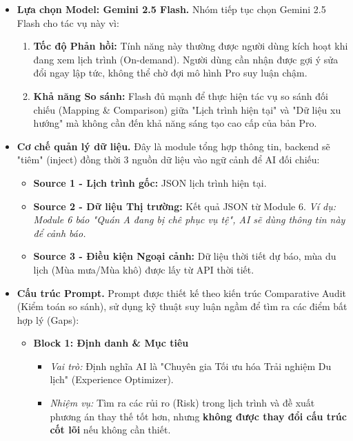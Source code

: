 \begin{itemize}
    \item \textbf{Lựa chọn Model: Gemini 2.5 Flash.} Nhóm tiếp tục chọn Gemini 2.5 Flash cho tác vụ này vì:
    \begin{enumerate}[label=\arabic*., leftmargin=*]
        \item \textbf{Tốc độ Phản hồi:} Tính năng này thường được người dùng kích hoạt khi đang xem lịch trình (On-demand). Người dùng cần nhận được gợi ý sửa đổi ngay lập tức, không thể chờ đợi mô hình Pro suy luận chậm.
        
        \item \textbf{Khả năng So sánh:} Flash đủ mạnh để thực hiện tác vụ so sánh đối chiếu (Mapping \& Comparison) giữa "Lịch trình hiện tại" và "Dữ liệu xu hướng" mà không cần đến khả năng sáng tạo cao cấp của bản Pro.
    \end{enumerate}

    \item \textbf{Cơ chế quản lý dữ liệu.} Đây là module tổng hợp thông tin, backend sẽ "tiêm" (inject) đồng thời 3 nguồn dữ liệu vào ngữ cảnh để AI đối chiếu:
    \begin{itemize}
        \item \textbf{Source 1 - Lịch trình gốc:} JSON lịch trình hiện tại.
        \item \textbf{Source 2 - Dữ liệu Thị trường:} Kết quả JSON từ Module 6. \textit{Ví dụ: Module 6 báo "Quán A đang bị chê phục vụ tệ", AI sẽ dùng thông tin này để cảnh báo.}
        \item \textbf{Source 3 - Điều kiện Ngoại cảnh:} Dữ liệu thời tiết dự báo, mùa du lịch (Mùa mưa/Mùa khô) được lấy từ API thời tiết.
    \end{itemize}

    \item \textbf{Cấu trúc Prompt.} Prompt được thiết kế theo kiến trúc Comparative Audit (Kiểm toán so sánh), sử dụng kỹ thuật suy luận ngầm để tìm ra các điểm bất hợp lý (Gaps):
    \begin{itemize}
        \item \textbf{Block 1: Định danh \& Mục tiêu}
        \begin{itemize}
            \item \textit{Vai trò:} Định nghĩa AI là "Chuyên gia Tối ưu hóa Trải nghiệm Du lịch" (Experience Optimizer).
            \item \textit{Nhiệm vụ:} Tìm ra các rủi ro (Risk) trong lịch trình và đề xuất phương án thay thế tốt hơn, nhưng \textbf{không được thay đổi cấu trúc cốt lõi} nếu không cần thiết.
        \end{itemize}
        

\end{itemize}
\end{itemize}
